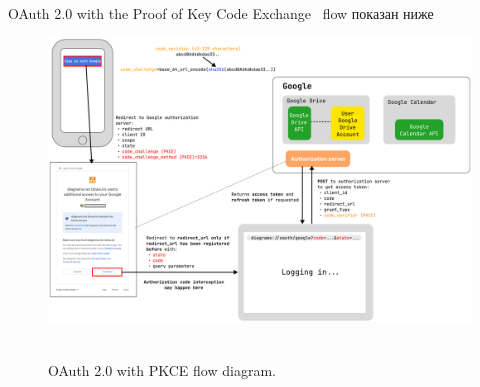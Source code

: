 OAuth 2.0 with the Proof of Key Code Exchange~\cite{bradley2015rfc} flow показан ниже
\begin{figure}[H]
    \centering
    \includegraphics[width=1\textwidth]{img/OAuthPkceScheme_1570_1055}
    ~\caption{OAuth 2.0 with PKCE flow diagram.}\label{fig:figure2}
\end{figure}

